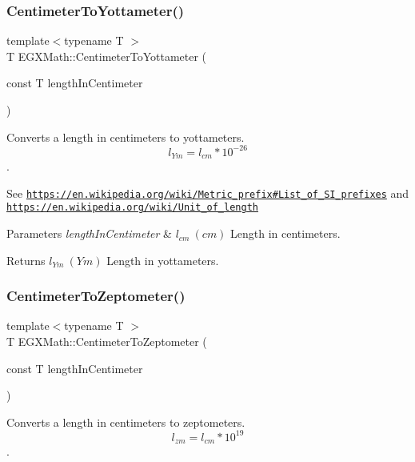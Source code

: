 \subsubsection{\texorpdfstring{Centimeter\+To\+Yottameter()}{CentimeterToYottameter()}}
{\footnotesize\ttfamily template$<$typename T $>$ \\
T E\+G\+X\+Math\+::\+Centimeter\+To\+Yottameter (\begin{DoxyParamCaption}\item[{const T}]{length\+In\+Centimeter }\end{DoxyParamCaption})}



Converts a length in centimeters to yottameters. \[ l_{Ym}=l_{cm} * 10^{-26} \]. 

See \href{https://en.wikipedia.org/wiki/Metric_prefix#List_of_SI_prefixes}{\tt https\+://en.\+wikipedia.\+org/wiki/\+Metric\+\_\+prefix\#\+List\+\_\+of\+\_\+\+S\+I\+\_\+prefixes} and \href{https://en.wikipedia.org/wiki/Unit_of_length}{\tt https\+://en.\+wikipedia.\+org/wiki/\+Unit\+\_\+of\+\_\+length} 
\begin{DoxyParams}{Parameters}
{\em length\+In\+Centimeter} & $ l_{cm}\ (cm)$ Length in centimeters. \\
\hline
\end{DoxyParams}
\begin{DoxyReturn}{Returns}
$ l_{Ym}\ (Ym)$ Length in yottameters. 
\end{DoxyReturn}
\mbox{\label{group___e_g_x_math-_conversions-_length_conversions-_centimeter-_s_i_ga1f7a10f9710f514dcc9132d4ce1f0bfa}} 
\subsubsection{\texorpdfstring{Centimeter\+To\+Zeptometer()}{CentimeterToZeptometer()}}
{\footnotesize\ttfamily template$<$typename T $>$ \\
T E\+G\+X\+Math\+::\+Centimeter\+To\+Zeptometer (\begin{DoxyParamCaption}\item[{const T}]{length\+In\+Centimeter }\end{DoxyParamCaption})}



Converts a length in centimeters to zeptometers. \[ l_{zm}=l_{cm} * 10^{19} \]. 

